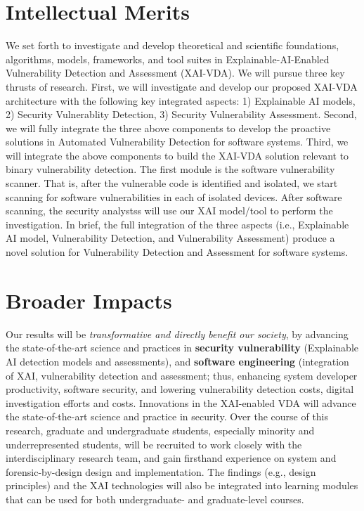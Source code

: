 \documentclass[11pt]{article}
\begin{document}
\section {Intellectual Merits}

We set forth to investigate and develop theoretical and scientific
foundations, algorithms, models, frameworks, and tool suites in
Explainable-AI-Enabled Vulnerability Detection and Assessment
(XAI-VDA). We will pursue three key thrusts of research. First, we
will investigate and develop our proposed XAI-VDA architecture with
the following key integrated aspects: 1) Explainable AI models, 2)
Security Vulnerablity Detection, 3) Security Vulnerability
Assessment. Second, we will fully integrate the three above components
to develop the proactive solutions in Automated Vulnerability
Detection for software systems. Third, we will integrate the above
components to build the XAI-VDA solution relevant to binary
vulnerability detection. The first module is the software
vulnerability scanner.  That is, after the vulnerable code is
identified and isolated, we start scanning for software
vulnerabilities in each of isolated devices.  After software scanning,
the security analystss will use our XAI model/tool to perform the
investigation. In brief, the full integration of the three aspects
(i.e., Explainable AI model, Vulnerability Detection, and
Vulnerability Assessment) produce a novel solution for Vulnerability
Detection and Assessment for software systems.

\section{Broader Impacts}

Our results will be {\em transformative and directly benefit our
  society}, by advancing the state-of-the-art science and practices in
{\bf security vulnerability} (Explainable AI detection models and
assessments), and {\bf software engineering} (integration of XAI,
vulnerability detection and assessment; thus, enhancing system
developer productivity, software security, and lowering vulnerability
detection costs, digital investigation efforts and costs.  Innovations
in the XAI-enabled VDA will advance the state-of-the-art science and
practice in security. Over the course of this research, graduate and
undergraduate students, especially minority and underrepresented
students, will be recruited to work closely with the interdisciplinary
research team, and gain firsthand experience on system and
forensic-by-design design and implementation. The findings (e.g.,
design principles) and the XAI technologies will also be integrated
into learning modules that can be used for both undergraduate- and
graduate-level courses.
\end{document}

